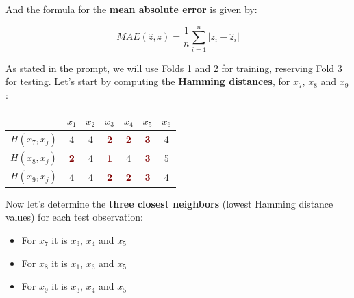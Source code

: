 \documentclass[12pt]{article}
\begin{document}
\begin{enumerate}[leftmargin=\labelsep]
\begin{enumerate}
                And the formula for the \textbf{mean absolute error} is given by:

                \begin{equation}\label{exI2-a-MAE}
                  MAE(\hat{z}, z) = \frac{1}{n} \sum_{i=1}^{n} \left| z_i - \hat{z}_i \right|
                \end{equation}

                As stated in the prompt, we will use Folds 1 and 2 for training, reserving Fold 3 for testing. Let's start by computing
                the \textbf{Hamming distances}, for $x_7$, $x_8$ and $x_9$:

                \begin{center}
                  \begin{tabular}{c|cccccc}
                                   & \(x_1\)                        & \(x_2\) & \(x_3\)                        & \(x_4\)                        & \(x_5\)                        & \(x_6\) \\
                    \hline
                    \(H(x_7,x_j)\) & 4                              & 4       & \textcolor{Maroon}{\textbf{2}} & \textcolor{Maroon}{\textbf{2}} & \textcolor{Maroon}{\textbf{3}} & 4       \\
                    \(H(x_8,x_j)\) & \textcolor{Maroon}{\textbf{2}} & 4       & \textcolor{Maroon}{\textbf{1}} & 4                              & \textcolor{Maroon}{\textbf{3}} & 5       \\
                    \(H(x_9,x_j)\) & 4                              & 4       & \textcolor{Maroon}{\textbf{2}} & \textcolor{Maroon}{\textbf{2}} & \textcolor{Maroon}{\textbf{3}} & 4       \\
                  \end{tabular}
                \end{center}

                Now let's determine the \textbf{three closest neighbors} (lowest Hamming distance values) for each test observation:

                \begin{itemize}
                  \item For $x_7$ it is $x_3$, $x_4$ and $x_5$
                  \item For $x_8$ it is $x_1$, $x_3$ and $x_5$
                  \item For $x_9$ it is $x_3$, $x_4$ and $x_5$
                \end{itemize}


\end{enumerate}
\end{enumerate}
\end{document}
